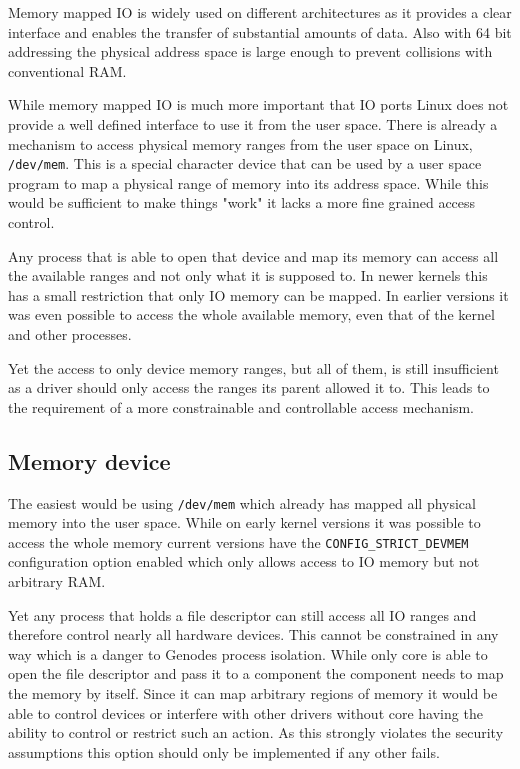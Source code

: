 \documentclass[
a4paper,
12pt,
notitlepage,
parskip=half,
DIV=11,
]{scrbook}
\begin{document}
		Memory mapped IO is widely used on different architectures as it provides a clear interface and enables the transfer of substantial amounts of data.
		Also with 64 bit addressing the physical address space is large enough to prevent collisions with conventional RAM.
		\citep{intelmanual}
		
		While memory mapped IO is much more important that IO ports Linux does not provide a well defined interface to use it from the user space.
		There is already a mechanism to access physical memory ranges from the user space on Linux, \texttt{/dev/mem}.
		This is a special character device that can be used by a user space program to map a physical range of memory into its address space.
		While this would be sufficient to make things "work" it lacks a more fine grained access control.
		
		Any process that is able to open that device and map its memory can access all the available ranges and not only what it is supposed to.
		In newer kernels this has a small restriction that only IO memory can be mapped.
		In earlier versions it was even possible to access the whole available memory, even that of the kernel and other processes. \citep{devmem}
		
		Yet the access to only device memory ranges, but all of them, is still insufficient as a driver should only access the ranges its parent allowed it to.
		This leads to the requirement of a more constrainable and controllable access mechanism.
		
		
		\subsection{Memory device}
		
		The easiest would be using \texttt{/dev/mem} which already has mapped all physical memory into the user space.
		While on early kernel versions it was possible to access the whole memory current versions have the \texttt{CONFIG\_STRICT\_DEVMEM} configuration option enabled which only allows access to IO memory but not arbitrary RAM.
		
		Yet any process that holds a file descriptor can still access all IO ranges and therefore control nearly all hardware devices.
		This cannot be constrained in any way which is a danger to Genodes process isolation.
		While only core is able to open the file descriptor and pass it to a component the component needs to map the memory by itself.
		Since it can map arbitrary regions of memory it would be able to control devices or interfere with other drivers without core having the ability to control or restrict such an action.
		As this strongly violates the security assumptions this option should only be implemented if any other fails. \citep{devmem} 
		
\end{document}

